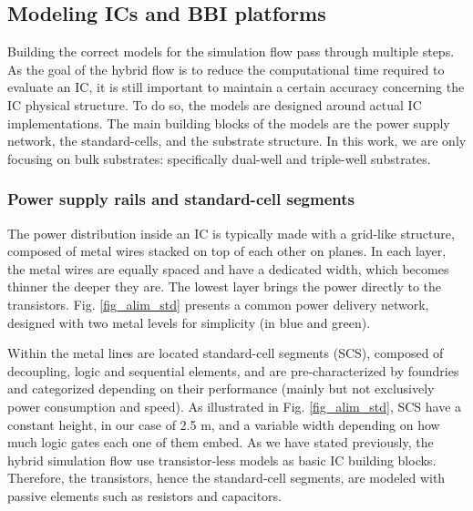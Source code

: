 \subsection{Modeling ICs and BBI platforms}
	Building the correct models for the simulation flow pass through multiple steps.
	As the goal of the hybrid flow is to reduce the computational time required to evaluate an IC, it is still important to maintain a certain accuracy concerning the IC physical structure.
	To do so, the models are designed around actual IC implementations.
	The main building blocks of the models are the power supply network, the standard-cells, and the substrate structure.
	In this work, we are only focusing on bulk substrates: specifically dual-well and triple-well substrates.

	\subsubsection{Power supply rails and standard-cell segments}
		
		The power distribution inside an IC is typically made with a grid-like structure, composed of metal wires stacked on top of each other on planes.
		In each layer, the metal wires are equally spaced and have a dedicated width, which becomes thinner the deeper they are.
		The lowest layer brings the power directly to the transistors.
		Fig. \ref{fig_alim_std} presents a common power delivery network, designed with two metal levels for simplicity (in blue and green).

		Within the metal lines are located standard-cell segments (SCS), composed of decoupling, logic and sequential elements, and are pre-characterized by foundries and categorized depending on their performance (mainly but not exclusively power consumption and speed).
		As illustrated in Fig. \ref{fig_alim_std}, SCS have a constant height, in our case of 2.5 \textmu m, and a variable width depending on how much logic gates each one of them embed.
		As we have stated previously, the hybrid simulation flow use transistor-less models as basic IC building blocks.
		Therefore, the transistors, hence the standard-cell segments, are modeled with passive elements such as resistors and capacitors.

